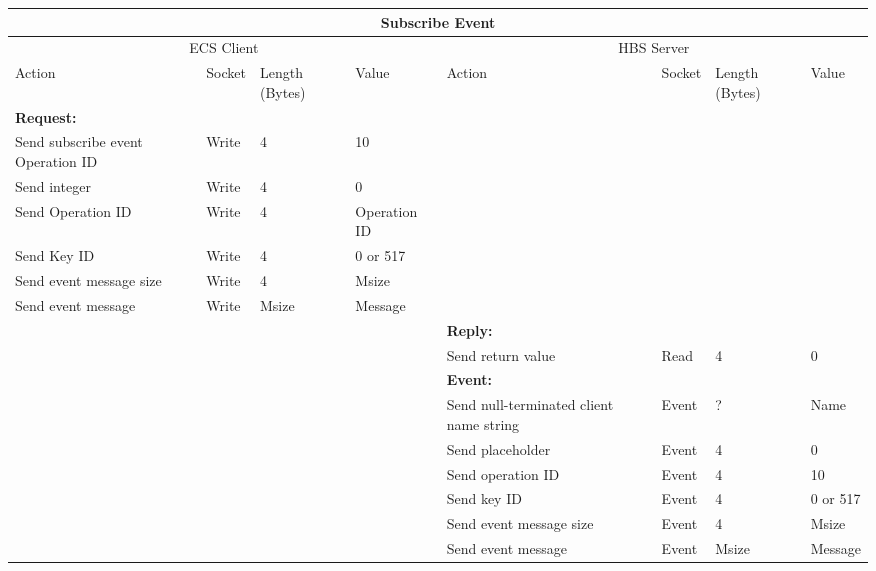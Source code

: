 \bigskip
\small
\begin{tabular}{|p{1.2in}|p{.4in}|p{.4in}|p{.5in}|p{1.2in}|p{.4in}|p{.4in}|p{.5in} |} \hline
\multicolumn{8}{|c|}{{\bf Subscribe Event}} \\ \hline
\multicolumn{4}{|c|}{ECS Client} & \multicolumn{4}{|c|}{HBS Server} \\ \hline
Action            & Socket & Length  
                            (Bytes)& Value & Action       & Socket & Length 
                                                                    (Bytes)& Value \\ \hline
\multicolumn{4}{|l}{{\bf Request:}}&\multicolumn{4}{|l|}{~} \\ \hline
Send subscribe event Operation ID  & Write  & 4     & 10     &              &        &       &       \\ \hline
Send  integer      & Write  & 4     &  0 &           &        &       &       \\ \hline
Send Operation ID    & Write  & 4     & Operation ID   &              &        &       &       \\ \hline
Send Key ID    & Write  & 4     &  0 or 517 &        &        &       &       \\ \hline
Send event
message size      & Write  & 4     &  Msize &         &        &       &       \\ \hline
Send event message
                  & Write  &  Msize  &  Message &     &        &       &       \\ \hline
\multicolumn{4}{|l}{~}&\multicolumn{4}{|l|}{{\bf Reply:}} \\ \hline
                  &        &       &       & Send return
                                             value        & Read   &  4    & 0       \\ \hline
\multicolumn{4}{|l}{~}&\multicolumn{4}{|l|}{{\bf Event:}} \\ \hline
                  &        &       &       & Send null-terminated client
                                             name string  & Event  &  ?    & Name  \\ \hline
                  &        &       &       & Send placeholder  & Event  &   4   &   0    \\  \hline
                  &        &       &       & Send operation 
                                             ID           & Event  &   4   &  10   \\ \hline
                  &        &       &       & Send key ID    & Event  &   4   &  0 or 517    \\ \hline
                  &        &       &       & Send event message
                                                  size    & Event  &   4   &  Msize \\ \hline
                  &        &       &       & Send event message
                                                          & Event  & Msize & Message  \\ \hline
\end{tabular}
\normalsize
\bigskip




